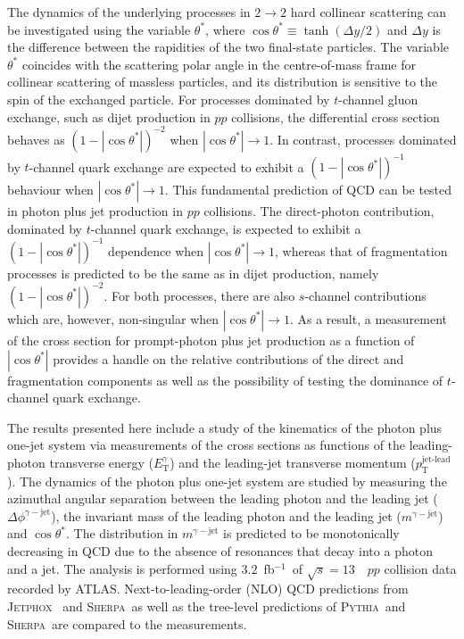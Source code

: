\documentclass[cernpreprint,texlive=2016,txfonts,UKenglish]{latex/atlasdoc}
\def\ptjetl{p_{\mathrm{T}}^{\text{jet-lead}}}
\def\etg{E_{\mathrm{T}}^{\gamma}}
\def\mgj{m^{\gamma-{\mathrm{jet}}}}
\def\ctgj{\cos\theta^*}
\def\deltaphigj{\Delta\phi^{\gamma-{\mathrm{jet}}}}
\def\fb1{fb$^{-1}$}
\def\sher{{\textsc{Sherpa}}}
\def\pyt{{\textsc{Pythia}}}
\def\jetp{{\textsc{Jetphox}}}
\begin{document}
The dynamics of the underlying processes in $2\rightarrow 2$ hard
collinear scattering can be investigated using the variable
$\theta^*$, where $\ctgj\equiv\tanh(\Delta y/2)$ and $\Delta y$ is the
difference between the rapidities of the two final-state
particles. The variable $\theta^*$ coincides with the scattering polar
angle in the centre-of-mass frame for collinear scattering of massless
particles, and its distribution is sensitive to the spin of the
exchanged particle. For processes dominated by $t$-channel gluon
exchange, such as dijet production in $pp$ collisions, the
differential cross section behaves as $(1-|\ctgj|)^{-2}$ when
$|\ctgj|\rightarrow 1$. In contrast, processes dominated by
$t$-channel quark exchange are expected to exhibit a
$(1-|\ctgj|)^{-1}$ behaviour when $|\ctgj|\rightarrow 1$. This
fundamental prediction of QCD can be tested in photon plus jet
production in $pp$ collisions. The direct-photon contribution,
dominated by $t$-channel quark exchange, is expected to exhibit a
$(1-|\ctgj|)^{-1}$ dependence when $|\ctgj|\rightarrow 1$, whereas
that of fragmentation processes is predicted to be the same as in
dijet production, namely $(1-|\ctgj|)^{-2}$. For both processes, there
are also $s$-channel contributions which are, however, non-singular
when $|\ctgj|\rightarrow 1$. As a result, a measurement of the cross
section for prompt-photon plus jet production as a function of
$|\ctgj|$ provides a handle on the relative contributions of the
direct and fragmentation components as well as the possibility of
testing the dominance of $t$-channel quark exchange.

The results presented here include a study of the kinematics of the
photon plus one-jet system via measurements of the cross sections as
functions of the leading-photon transverse energy ($\etg$) and the
leading-jet transverse momentum ($\ptjetl$). The dynamics of the
photon plus one-jet system are studied by measuring the azimuthal
angular separation between the leading photon and the leading jet
($\deltaphigj$), the invariant mass of the leading photon and the
leading jet ($\mgj$) and $\ctgj$. The distribution in $\mgj$ is
predicted to be monotonically decreasing in QCD due to the absence of
resonances that decay into a photon and a jet. The analysis is
performed using $3.2$~\fb1\ of $\sqrt s=13$~\TeV\ $pp$ collision data
recorded by ATLAS. Next-to-leading-order (NLO) QCD predictions from
\jetp~\cite{jhep:0205:028,pr:d73:094007} and \sher\ as well as the
tree-level predictions of \pyt\ and \sher\ are compared to the
measurements.
\end{document}
